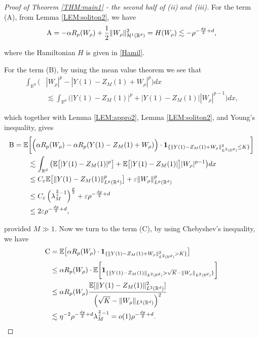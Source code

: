 \documentclass[%
11pt,  reqno]{amsart}
\theoremstyle{remarkstyle}
\newcommand{\1}{\hspace{0.2mm}\text{I}\hspace{0.2mm}}
\newcommand{\noi}{\noindent}
\newcommand{\R}{\mathbb{R}}
\newcommand{\E}{\mathbb{E}}
\newcommand{\al}{\alpha}
\newcommand{\eps}{\varepsilon}
\newcommand{\ld}{\lambda}
\newcommand{\les}{\lesssim}
\newcommand{\ind}{\mathbf 1}
\renewcommand{\H}{\mathcal{H}}
\numberwithin{equation}{section}
\numberwithin{theorem}{section}
\begin{document}
\begin{proof}[Proof of Theorem \ref{THM:main1} - the second half of \textup{(ii) $and$ (iii)}]
		For the term (A), 
		from Lemma \ref{LEM:soliton2}, we have
		\begin{align}
			\label{term1}
			\textup{A}  = - \al R_p (W_\rho) + \frac12 \| W_\rho\|_{\H^1 (\R^d)}^2 = H (W_\rho) \les - \rho^{-\frac{dp}2 +d},
		\end{align}
		
		\noi
		where the Hamiltonian $H$ is given in \eqref{Hamil}.
		
		For the term (B),
		by using the mean value theorem we see that
		\[
		\begin{split}
			\int_{\R^d} \big( & |W_\rho|^p - |Y(1) - Z_M (1) + W_\rho|^p \big) dx \\
			& \les 
			\int_{\R^d} \big( |Y(1) - Z_M (1) |^p + |Y(1) - Z_M (1)| |  W_\rho|^{p-1} \big) dx ,
		\end{split}
		\]
		
		\noi
		which together with Lemma \ref{LEM:appro2}, Lemma \ref{LEM:soliton2}, and Young's inequality, gives
		\begin{align}
			\label{term3}
			\begin{split}
				\textup{B} = \E & \bigg[ \Big( \al R_p (W_\rho) - \al R_p ( Y(1) - Z_M (1) + W_\rho ) \Big)  \cdot \ind_{\{\| Y(1) - Z_M (1) + W_\rho \|^2_{L^2 (\R^d)}\le K\}}\bigg] \\
				& \les \int_{\R^d} \big( \E \big[ |Y(1) - Z_M (1) |^p \big] + \E \big[ |Y(1) - Z_M (1)|\big] | W_\rho|^{p-1} \big) dx\\
				& \le C_\eps \E \big[ \| Y(1) - Z_M (1) \|_{L^p(\R^d)}^p \big]  + \eps \| W_\rho \|_{L^p(\R^d)}^p\\
				& \le C_\eps \left(\ld_M^{\frac2s - 1}\right)^{\frac{p}2} + \eps \rho^{-\frac{dp}2 +d}\\ 
				& \le 2\eps \rho^{-\frac{dp}2 +d},
			\end{split}
		\end{align}
		
		\noi
		provided $M\gg 1$.
		Now we turn to the term (C),
		by using Chebyshev's inequality,  
		we have
		\begin{align}
			\begin{split}
				\textup{C} &= \E \big[ \al R_p(W_\rho) \cdot \ind_{\{\| Y(1) - Z_M (1) + W_\rho \|^2_{L^2 (\R^d)} > K\}} \big] \\
				& \le \al R_p(W_\rho) \cdot \E \bigg[ \ind_{\{\| Y(1) - Z_M (1)\|_{L^2 (\R^d)}  > \sqrt{K} - \| W_\rho \|_{L^2 (\R^d)}\}} \bigg]\\
				& \le \al R_p(W_\rho) \frac{\E [\| Y(1) - Z_M (1)\|_{L^2 (\R^d)}^2] }{\left(\sqrt{K} - \| W_\rho \|_{L^2 (\R^d)}\right)^2}\\ 
				& \les \eta^{-2} \rho^{-\frac{dp}2 +d} \ld_M^{\frac2s - 1} = o(1) \rho^{-\frac{dp}2 +d} .
			\end{split}
			\label{term4}
		\end{align}
		

\end{proof}
\end{document}
